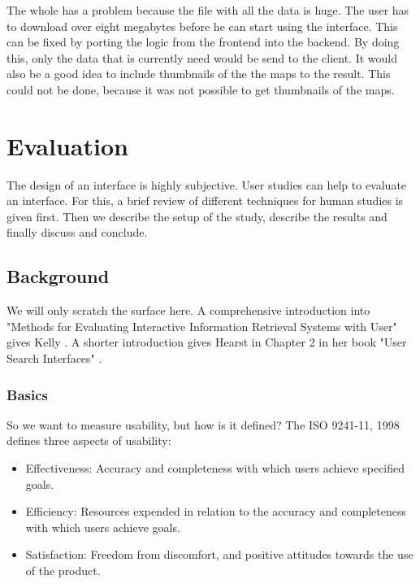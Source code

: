 \documentclass[11pt]{report}
\begin{document}
The whole has a problem because the  file with all the data is huge. The user has to download over eight megabytes before he can start using the interface. This can be fixed by porting the logic from the frontend into the backend. By doing this, only the data that is currently need would be send to the client. It would also be a good idea to include thumbnails of the the maps to the result. This could not be done, because it was not possible to get thumbnails of the maps.

\chapter{Evaluation}
\label{Evaluation}

The design of an interface is highly subjective. User studies can help to evaluate an interface. For this, a brief review of different techniques for human studies is given first. Then we describe the setup of the study, describe the results and finally discuss and conclude. \\

\section{Background}

We will only scratch the surface here. A comprehensive introduction into "Methods for Evaluating Interactive Information Retrieval Systems with User" gives Kelly \cite{Kelly2007}. A shorter introduction gives Hearst in Chapter 2 in her book "User Search Interfaces" \cite{Hearst2009}.\\

\subsection{Basics}

So we want to measure usability, but how is it defined? The ISO 9241-11, 1998 \cite{ISO} defines three aspects of usability:
\begin{itemize}
	\item Effectiveness: Accuracy and completeness with which users achieve specified goals.
	\item Efficiency: Resources expended in relation to the accuracy and completeness with which users achieve goals.
	\item Satisfaction: Freedom from discomfort, and positive attitudes towards the use of the product.
\end{itemize}
\end{document}
